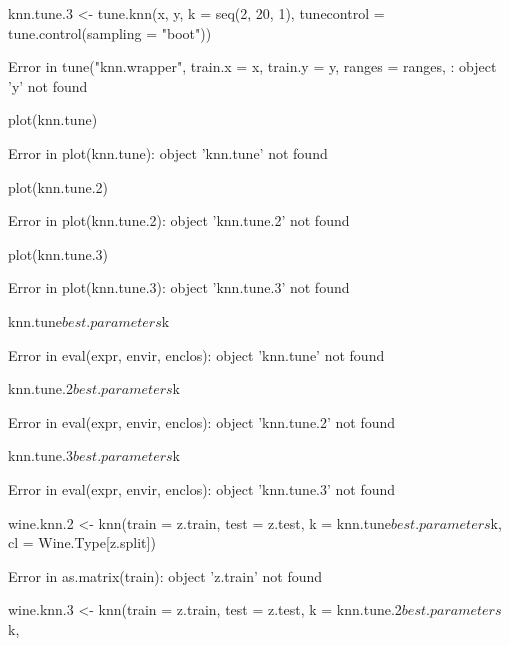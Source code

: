 \documentclass[letterpaper]{article}\usepackage[]{graphicx}\usepackage[]{color}
\begin{document}
\begin{Schunk}
\begin{Sinput}
knn.tune.3 <- tune.knn(x, y, k = seq(2, 20, 1), tunecontrol = tune.control(sampling = "boot"))
\end{Sinput}
\begin{Soutput}
Error in tune("knn.wrapper", train.x = x, train.y = y, ranges = ranges, : object 'y' not found
\end{Soutput}
\begin{Sinput}
plot(knn.tune)
\end{Sinput}
\begin{Soutput}
Error in plot(knn.tune): object 'knn.tune' not found
\end{Soutput}
\begin{Sinput}
plot(knn.tune.2)
\end{Sinput}
\begin{Soutput}
Error in plot(knn.tune.2): object 'knn.tune.2' not found
\end{Soutput}
\begin{Sinput}
plot(knn.tune.3)
\end{Sinput}
\begin{Soutput}
Error in plot(knn.tune.3): object 'knn.tune.3' not found
\end{Soutput}
\begin{Sinput}
knn.tune$best.parameters$k
\end{Sinput}
\begin{Soutput}
Error in eval(expr, envir, enclos): object 'knn.tune' not found
\end{Soutput}
\begin{Sinput}
knn.tune.2$best.parameters$k
\end{Sinput}
\begin{Soutput}
Error in eval(expr, envir, enclos): object 'knn.tune.2' not found
\end{Soutput}
\begin{Sinput}
knn.tune.3$best.parameters$k
\end{Sinput}
\begin{Soutput}
Error in eval(expr, envir, enclos): object 'knn.tune.3' not found
\end{Soutput}
\begin{Sinput}
wine.knn.2 <- knn(train = z.train, test = z.test, k = knn.tune$best.parameters$k, 
    cl = Wine.Type[z.split])
\end{Sinput}
\begin{Soutput}
Error in as.matrix(train): object 'z.train' not found
\end{Soutput}
\begin{Sinput}
wine.knn.3 <- knn(train = z.train, test = z.test, k = knn.tune.2$best.parameters$k, 

\end{Sinput}
\end{Schunk}
\end{document}
